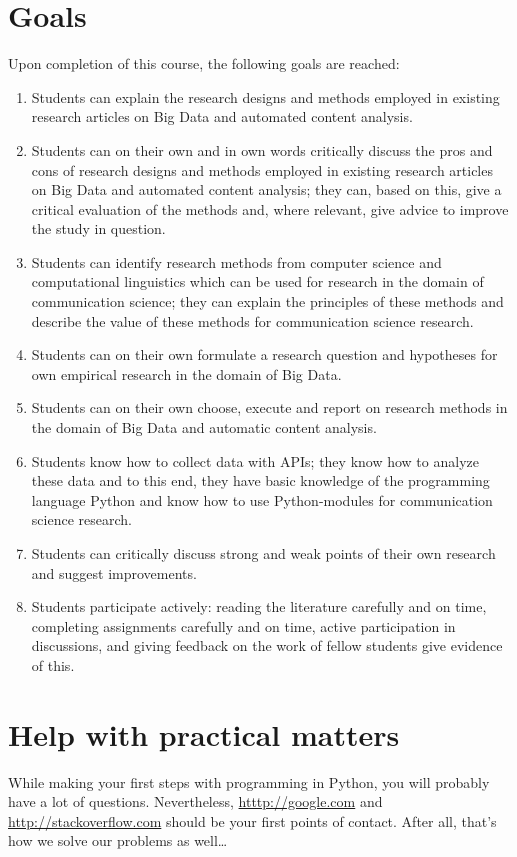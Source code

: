\documentclass[a4paper,10pt,twocolumn]{report}
\begin{document}
\section{Goals}
Upon completion of this course, the following goals are reached:
\begin{enumerate}[A]
\item Students can explain the research designs and methods employed in existing research articles on Big Data and automated content analysis.
\item Students can on their own and in own words critically discuss the pros and cons of research designs and methods employed in existing research articles on Big Data and automated content analysis; they can, based on this, give a critical evaluation of the methods and, where relevant, give advice to improve the study in question.
\item Students can identify research methods from computer science and computational linguistics which can be used for research in the domain of communication science; they can explain the principles of these methods and describe the value of these methods for communication science research.
\item Students can on their own formulate a research question and hypotheses for own empirical research in the domain of Big Data.
\item Students can on their own choose, execute and report on research methods in the domain of Big Data and automatic content analysis.
\item Students know how to collect data with APIs; they know how to analyze these data and to this end, they have basic knowledge of the programming language Python and know how to use Python-modules for communication science research.
\item Students can critically discuss strong and weak points of their own research and suggest improvements.
\item Students participate actively: reading the literature carefully and on time, completing assignments carefully and on time, active participation in discussions, and giving feedback on the work of fellow students give evidence of this.
\end{enumerate}

\section{Help with practical matters}
While making your first steps with programming in Python, you will probably have a lot of questions.
Nevertheless, \url{htttp://google.com} and \url{http://stackoverflow.com} should be your first points of contact. After all, that's how we solve our problems as well\ldots
\end{document}
